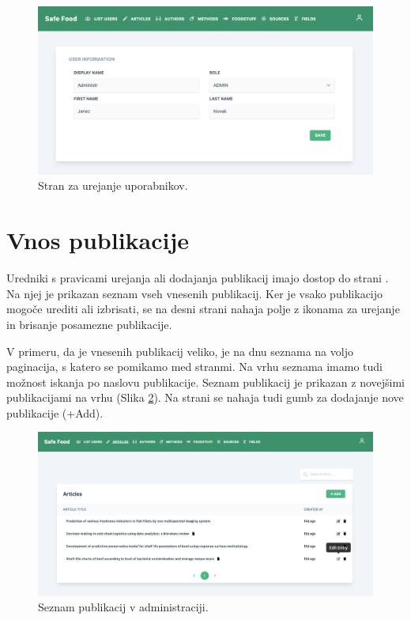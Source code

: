 \documentclass[a4paper, 12pt]{book}
\begin{document}
\begin{figure}[h]
\begin{center}
\includegraphics[width=1\textwidth]{slike/users-edit.png}
\end{center}
\caption{ Stran za urejanje uporabnikov. }
\label{users-edit-page}
\end{figure}


\section{Vnos publikacije}
Uredniki s pravicami urejanja ali dodajanja publikacij imajo dostop do strani . Na njej je prikazan seznam vseh vnesenih publikacij. Ker je vsako publikacijo mogoče urediti ali izbrisati, se na desni strani nahaja polje z ikonama za urejanje in brisanje posamezne publikacije. 

V primeru, da je vnesenih publikacij veliko, je na dnu seznama na voljo paginacija, s katero se pomikamo med stranmi. Na vrhu seznama imamo tudi možnost iskanja po naslovu publikacije. Seznam publikacij je prikazan z novejšimi publikacijami na vrhu (Slika \ref{list-articles}). Na strani se nahaja tudi gumb za dodajanje nove publikacije (+Add).

\begin{figure}[h]
\begin{center}
\includegraphics[width=1\textwidth]{slike/list-articles.png}
\end{center}
\caption{ Seznam publikacij v administraciji. }
\label{list-articles}
\end{figure}
\end{document}
